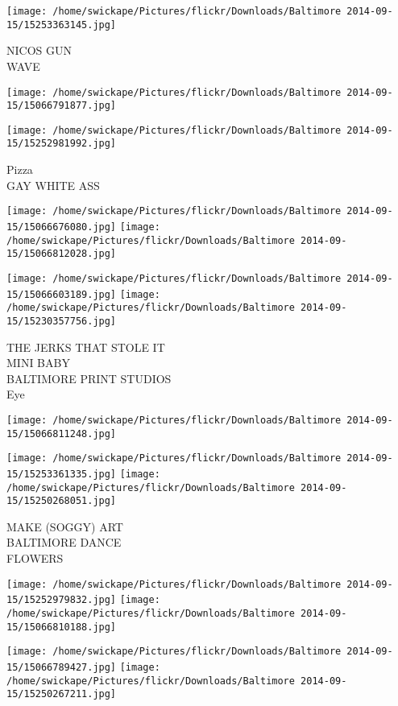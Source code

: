 \documentclass[10pt,letterpaper]{article}
\begin{document}
\vspace{0.25in}
\texttt{[image: /home/swickape/Pictures/flickr/Downloads/Baltimore 2014-09-15/15253363145.jpg]}

NICOS GUN\\
WAVE
\pagebreak

\texttt{[image: /home/swickape/Pictures/flickr/Downloads/Baltimore 2014-09-15/15066791877.jpg]}

\vspace{0.25in}
\texttt{[image: /home/swickape/Pictures/flickr/Downloads/Baltimore 2014-09-15/15252981992.jpg]}

Pizza\\
GAY WHITE ASS
\pagebreak

\texttt{[image: /home/swickape/Pictures/flickr/Downloads/Baltimore 2014-09-15/15066676080.jpg]}
\texttt{[image: /home/swickape/Pictures/flickr/Downloads/Baltimore 2014-09-15/15066812028.jpg]}

\texttt{[image: /home/swickape/Pictures/flickr/Downloads/Baltimore 2014-09-15/15066603189.jpg]}
\texttt{[image: /home/swickape/Pictures/flickr/Downloads/Baltimore 2014-09-15/15230357756.jpg]}

THE JERKS THAT STOLE IT\\
MINI BABY\\
BALTIMORE PRINT STUDIOS\\
Eye
\pagebreak

\texttt{[image: /home/swickape/Pictures/flickr/Downloads/Baltimore 2014-09-15/15066811248.jpg]}

\vspace{0.25in}
\texttt{[image: /home/swickape/Pictures/flickr/Downloads/Baltimore 2014-09-15/15253361335.jpg]}
\texttt{[image: /home/swickape/Pictures/flickr/Downloads/Baltimore 2014-09-15/15250268051.jpg]}

MAKE (SOGGY) ART\\
BALTIMORE DANCE\\
FLOWERS
\pagebreak

\texttt{[image: /home/swickape/Pictures/flickr/Downloads/Baltimore 2014-09-15/15252979832.jpg]}
\texttt{[image: /home/swickape/Pictures/flickr/Downloads/Baltimore 2014-09-15/15066810188.jpg]}

\texttt{[image: /home/swickape/Pictures/flickr/Downloads/Baltimore 2014-09-15/15066789427.jpg]}
\texttt{[image: /home/swickape/Pictures/flickr/Downloads/Baltimore 2014-09-15/15250267211.jpg]}
\end{document}
